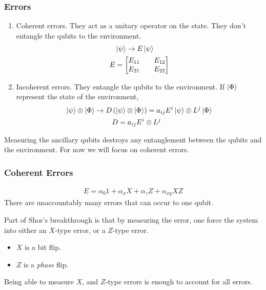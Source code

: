 \documentclass{beamer}
\renewcommand{\(}{\left(}
\renewcommand{\)}{\right)}
\renewcommand{\[}{\left[}
\renewcommand{\]}{\right]}
\begin{document}
\begin{frame}
    \frametitle{Errors}

    \begin{enumerate}
        \item Coherent errors. They act as a unitary operator on the state. They don't entangle the qubits to the environment. \begin{align*}
            &\ket{\psi} \rightarrow E\ket{\psi} \\ 
            E &= \begin{bmatrix}
                E_{11} && E_{12} \\ 
                E_{21} && E_{22}
                \end{bmatrix}
        \end{align*}
        \pause
        \item Incoherent errors. They entangle the qubits to the environment. If $\ket{\Phi}$ represent the state of the environment, \begin{align*}
            \ket{\psi}\otimes\ket{\Phi} \rightarrow   D &\(\ket{\psi}\otimes\ket{\Phi}\) = a_{ij} E^i\ket{\psi}\otimes L^j\ket{\Phi} \\
            &D = a_{ij} E^i \otimes L^j
        \end{align*} 
    \end{enumerate}
    \pause
    Measuring the ancillary qubits destroys any entanglement between the qubits and the environment. For now we will focus on coherent errors. 
\end{frame}

\begin{frame}
    \frametitle{Coherent Errors}
    \begin{align*}
        E = \alpha_0 1 + \alpha_x X + \alpha_z Z + \alpha_{xy}  XZ
    \end{align*}
    There are unaccountably many errors that can occur to one qubit. 

    Part of Shor's breakthrough is that by measuring the error, one force the system into either an $X$-type error, or a $Z$-type error. 
    \begin{itemize}
        \item $X$ is a bit flip. 
        \item $Z$ is a \emph{phase} flip.
    \end{itemize}
    \pause
    \begin{framed}
        \centering
        Being able to measure $X$, and $Z$-type errors is enough to account for all errors. 
    \end{framed}
\end{frame}
\end{document}
